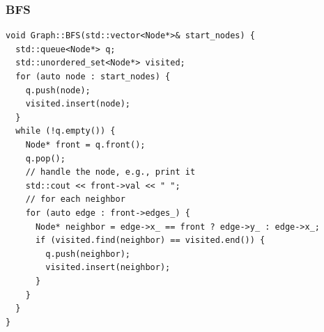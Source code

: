 \subsubsection{BFS}
\begin{lstlisting}
void Graph::BFS(std::vector<Node*>& start_nodes) {
  std::queue<Node*> q;
  std::unordered_set<Node*> visited;
  for (auto node : start_nodes) {
    q.push(node);
    visited.insert(node);
  }
  while (!q.empty()) {
    Node* front = q.front();
    q.pop();
    // handle the node, e.g., print it
    std::cout << front->val << " ";
    // for each neighbor
    for (auto edge : front->edges_) {
      Node* neighbor = edge->x_ == front ? edge->y_ : edge->x_;
      if (visited.find(neighbor) == visited.end()) {
        q.push(neighbor);
        visited.insert(neighbor);
      }
    }
  }
}
\end{lstlisting}

